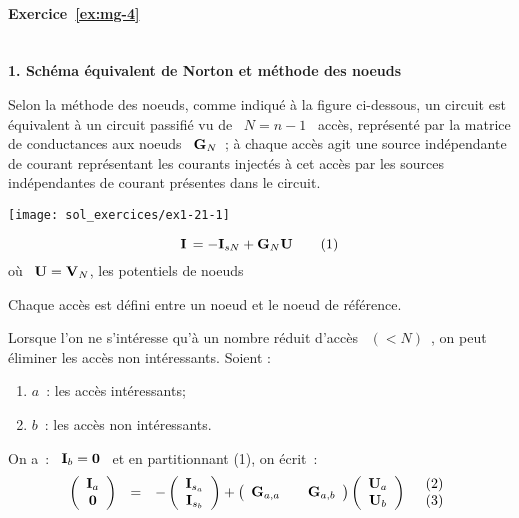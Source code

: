 			
\paragraph{Exercice~\ref{ex:mg-4}}~\\%
{\bf 1. Schéma équivalent de Norton et méthode des noeuds}

Selon la méthode des noeuds, comme indiqué à la figure ci-dessous,
un circuit est équivalent à un circuit passifié vu de \ $N=n-1$ \
accès, représenté par la matrice de conductances aux noeuds \ ${\bf
	G}_N$~; à chaque accès agit une source indépendante de courant
représentant les courants injectés à cet accès par les sources
indépendantes de courant présentes dans le circuit.

\noindent\parbox[c]{6cm}{
\begin{center}
\texttt{[image: sol\_exercices/ex1-21-1]}
\end{center}}
\parbox[c]{4cm}{
\[{\bf I} \, = -{\bf I}_{sN} + {\bf G}_N {\bf U}~~~~~~ (1)\]
où \ ${\bf U} = {\bf V}_N$, les potentiels de noeuds}

Chaque accès est défini entre un noeud et le noeud de référence.

Lorsque l'on ne s'intéresse qu'à un nombre réduit d'accès \ $(< N)$~,
on peut éliminer les accès non intéressants.
Soient :
\begin{enumerate}
\item $a$~: les accès intéressants;
\item $b$~: les accès non intéressants.
\end{enumerate}

On a~: \ ${\bf I}_{b}={\bf 0}$ \ et en partitionnant (1), on écrit~:
\[ \begin{array}{rclc}
\left( \begin{array}{c} {\bf I}_a \\ {\bf 0} \end{array} \right)
& = &
- \left( \begin{array}{c} {\bf I}_{s_a} \\  {\bf I}_{s_{b}}\end{array} \right)
+ \left( \begin{array}{ccc} 
{\bf G}_{a,a} &&  {\bf G}_{a,b}
\end{array} \right)
\left( \begin{array}{c} {\bf U}_{a} \\  {\bf U}_{b}\end{array} \right) 
& \begin{array}{c} (2) \\ (3) \end{array}
\end{array} \]

